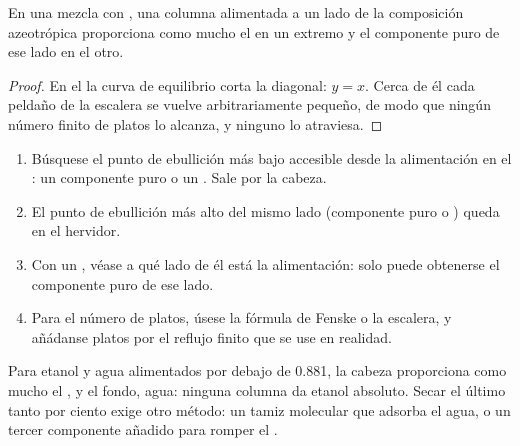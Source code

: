 \begin{proposition}\label{prop:b2:liquid-vapour-diagrams:azeotrope-limit}
En una mezcla con , una columna alimentada a un lado de la composición
azeotrópica proporciona como mucho el  en un extremo y el componente puro
de ese lado en el otro.
\end{proposition}

\begin{proof}
En el  la curva de equilibrio corta la diagonal: $y = x$. Cerca de él
cada peldaño de la escalera se vuelve arbitrariamente pequeño, de modo que ningún número finito de
platos lo alcanza, y ninguno lo atraviesa.
\end{proof}

\begin{method}\label{met:b2:liquid-vapour-diagrams:predict-distillation}
\begin{enumerate}
  \item Búsquese el punto de ebullición más bajo accesible desde la alimentación en el
        : un componente puro o un . Sale
        por la cabeza.
  \item El punto de ebullición más alto del mismo lado (componente puro o
        ) queda en el hervidor.
  \item Con un , véase a qué lado de él está la alimentación: solo puede
        obtenerse el componente puro de ese lado.
  \item Para el número de platos, úsese la fórmula de Fenske o la escalera,
        y añádanse platos por el reflujo finito que se use en realidad.
\end{enumerate}
\end{method}

Para etanol y agua alimentados por debajo de 0.881, la cabeza proporciona como mucho el
, y el fondo, agua: ninguna columna da etanol absoluto. Secar el
último tanto por ciento exige otro método: un tamiz molecular que adsorba el agua, o
un tercer componente añadido para romper el .


